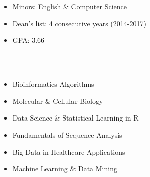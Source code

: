 \documentclass[hidelinks, 11pt]{article}
\begin{document}
\section*{}
\begin{addmargin}{.5in}

  \begin{itemize}\setlength\itemsep{-4pt}
    \item{Minors: English $\&$ Computer Science}
    \item{Dean's list: 4 consecutive years (2014-2017)}
    \item{GPA: 3.66}
  \end{itemize}
   \\ \\
  \vspace{-9pt}
  \begin{multicols}{2}
    \begin{itemize}\setlength\itemsep{-4pt}
      \item{Bioinformatics Algorithms}
      \item{Molecular $\&$ Cellular Biology}
      \item{Data Science $\&$ Statistical Learning in R}
      \item{Fundamentals of Sequence Analysis}
      \item{Big Data in Healthcare Applications}
      \item{Machine Learning $\&$ Data Mining}
    \end{itemize}
  \end{multicols}
\end{addmargin}
\vspace{-6pt}

\end{document}
